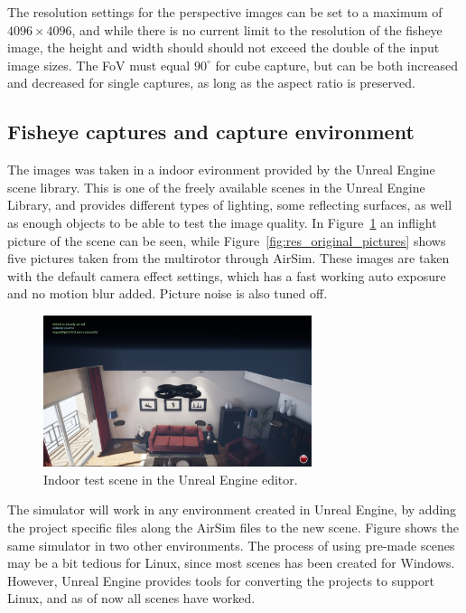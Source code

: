 The resolution settings for the perspective images can be set to a maximum of $4096\times4096$, and while there is no current limit to the resolution of the fisheye image, the height and width should should not exceed the double of the input image sizes. The FoV must equal $90^\circ$ for cube capture, but can be both increased and decreased for single captures, as long as the aspect ratio is preserved. 

\subsection{Fisheye captures and capture environment}

The images was taken in a indoor evironment provided by the Unreal Engine scene library. This is one of the freely available scenes in the Unreal Engine Library, and provides different types of lighting, some reflecting surfaces, as well as enough objects to be able to test the image quality. In Figure~\ref{fig:res_inflight} an inflight picture of the scene can be seen, while Figure~\ref{fig:res_original_pictures} shows five pictures taken from the multirotor through AirSim. These images are taken with the default camera effect settings, which has a fast working auto exposure and no motion blur added. Picture noise is also tuned off.

\begin{figure}[!htb]
    \centering
    \includegraphics[width = 0.7\textwidth]{rapport/fig/Results/inflight.jpg}
    \caption{Indoor test scene in the Unreal Engine editor.}
    \label{fig:res_inflight}
\end{figure}

The simulator will work in any environment created in Unreal Engine, by adding the project specific files along the AirSim files to the new scene. Figure  shows the same simulator in two other environments. The process of using pre-made scenes may be a bit tedious for Linux, since most scenes has been created for Windows. However, Unreal Engine provides tools for converting the projects to support Linux, and as of now all scenes have worked.

